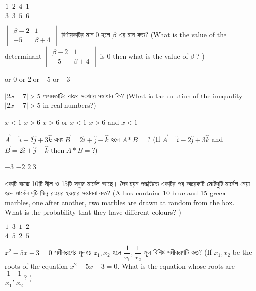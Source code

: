 \documentclass[addpoints]{exam}
\begin{document}
\begin{questions}
\begin{oneparchoices}
\choice $ \dfrac{1}{3} $
\choice $ \dfrac{2}{3} $
\choice $ \dfrac{4}{5} $
\choice $ \dfrac{1}{6} $
\end{oneparchoices}

\question $ \begin{vmatrix}
\beta -2 & 1\\
-5 & \beta +4
\end{vmatrix} $ নির্ণায়কটির মান $ 0 $ হলে $ \beta $ এর মান কত? (What is the value of the determinant $ \begin{vmatrix}
\beta -2 & 1\\
-5 & \beta +4
\end{vmatrix} $ is 0 then what is the value of $ \beta $ ? )


\begin{oneparchoices}
 or 0
 or 2 
 or $ -5 $
 or $ -3 $
\end{oneparchoices}

\question $ |2x-7|>5 $ অসমতাটির বাস্তব সংখ্যায় সমাধান কি? (What is the solution of the inequality $ |2x-7|>5 $ in real numbers?)


\begin{oneparchoices}
\choice $ x<1 $
\choice $ x>6 $
\choice $ x>6 $ or $ x<1 $
\choice $ x>6 $ and $ x<1 $
\end{oneparchoices}

\question $ \vec{A} = \hat{i}-2\hat{j}+3\hat{k} $ এবং $ \vec{B} = 2\hat{i}+\hat{j}-\hat{k} $ হলে $ A*B=? $ (If $ \vec{A} = \hat{i}-2\hat{j}+3\hat{k} $ and $ \vec{B} = 2\hat{i}+\hat{j}-\hat{k} $ then  $ A*B=? $)

\begin{oneparchoices}
\choice  $ -3 $
\choice  $ -2 $
\choice  $ 2 $
\choice  $ 3 $
\end{oneparchoices}

\question একটি বাক্সে 10টি নীল ও 15টি সবুজ মার্বেল আছে। দৈব চয়ন পদ্ধতিতে একটির পর আরেকটি মোটদুটি মার্বেল নেয়া হলে মার্বেল দুটি ভিন্ন রংয়ের হওয়ার সম্ভাবনা কত? (A box contains 10 blue and 15 green marbles, one after another, two marbles are drawn at random from the box. What is the probability that they have different colours?  )


\begin{oneparchoices}
\choice $ \dfrac{1}{4} $
\choice $ \dfrac{3}{5} $
\choice $ \dfrac{1}{2} $
\choice  $ \dfrac{2}{5} $
\end{oneparchoices}

\question $ x^{2}-5x-3= 0 $ সমীকরণের মূলদ্বয় $ x_{1},x_{2} $ হলে $ \dfrac{1}{x_{1}},\dfrac{1}{x_{2}} $ মূল বিশিষ্ট সমীকরণটি কত? (If $ x_{1},x_{2} $ be the roots of the equation $ x^{2}-5x-3= 0 $. What is the equation whose roots are $ \dfrac{1}{x_{1}},\dfrac{1}{x_{2}} $? )



\end{questions}
\end{document}
